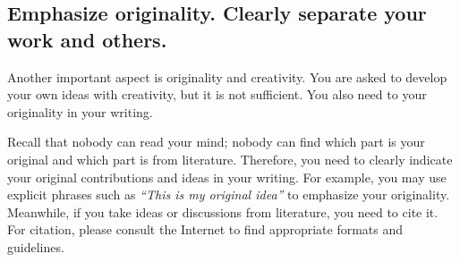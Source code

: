 \documentclass[11pt,pdfa,lastpage,minititle]{MishoNote}
\begin{document}
\subsection{Emphasize originality. Clearly separate your work and others.}
Another important aspect is originality and creativity.
You are asked to develop your own ideas with creativity, but it is not sufficient. You also need to  your originality in your writing.

Recall that nobody can read your mind; nobody can find which part is your original and which part is from literature.
Therefore, you need to clearly indicate your original contributions and ideas in your writing.
For example, you may use explicit phrases such as \emph{``This is my original idea''} to emphasize your originality.
Meanwhile, if you take ideas or discussions from literature, you need to cite it. For citation, please consult the Internet to find appropriate formats and guidelines.
\end{document}
